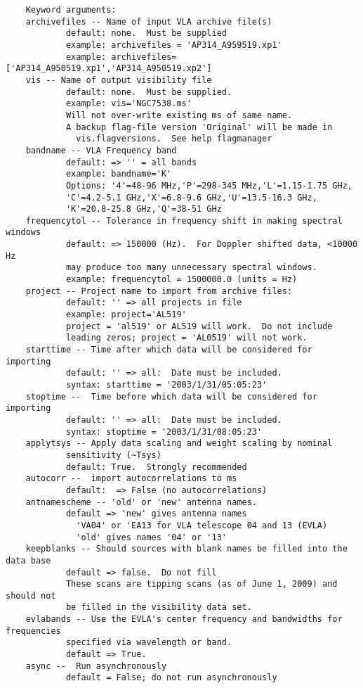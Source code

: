 \begin{verbatim}
    Keyword arguments:
    archivefiles -- Name of input VLA archive file(s)
            default: none.  Must be supplied
            example: archivefiles = 'AP314_A959519.xp1'
            example: archivefiles=['AP314_A950519.xp1','AP314_A950519.xp2']
    vis -- Name of output visibility file
            default: none.  Must be supplied.
            example: vis='NGC7538.ms'
            Will not over-write existing ms of same name.
            A backup flag-file version 'Original' will be made in
              vis.flagversions.  See help flagmanager
    bandname -- VLA Frequency band
            default: => '' = all bands
            example: bandname='K'
            Options: '4'=48-96 MHz,'P'=298-345 MHz,'L'=1.15-1.75 GHz,
            'C'=4.2-5.1 GHz,'X'=6.8-9.6 GHz,'U'=13.5-16.3 GHz,
            'K'=20.8-25.8 GHz,'Q'=38-51 GHz
    frequencytol -- Tolerance in frequency shift in making spectral windows
            default: => 150000 (Hz).  For Doppler shifted data, <10000 Hz 
            may produce too many unnecessary spectral windows.
            example: frequencytol = 1500000.0 (units = Hz)
    project -- Project name to import from archive files:
            default: '' => all projects in file
            example: project='AL519'
            project = 'al519' or AL519 will work.  Do not include
            leading zeros; project = 'AL0519' will not work.
    starttime -- Time after which data will be considered for importing
            default: '' => all:  Date must be included.
            syntax: starttime = '2003/1/31/05:05:23'
    stoptime --  Time before which data will be considered for importing
            default: '' => all:  Date must be included.
            syntax: stoptime = '2003/1/31/08:05:23'
    applytsys -- Apply data scaling and weight scaling by nominal
            sensitivity (~Tsys)
            default: True.  Strongly recommended
    autocorr --  import autocorrelations to ms
            default:  => False (no autocorrelations)
    antnamescheme -- 'old' or 'new' antenna names.
            default => 'new' gives antenna names
              'VA04' or 'EA13 for VLA telescope 04 and 13 (EVLA)
              'old' gives names '04' or '13'
    keepblanks -- Should sources with blank names be filled into the data base
            default => false.  Do not fill
            These scans are tipping scans (as of June 1, 2009) and should not
            be filled in the visibility data set.
    evlabands -- Use the EVLA's center frequency and bandwidths for frequencies
            specified via wavelength or band. 
            default => True. 
    async --  Run asynchronously
            default = False; do not run asynchronously

\end{verbatim}
\normalsize

